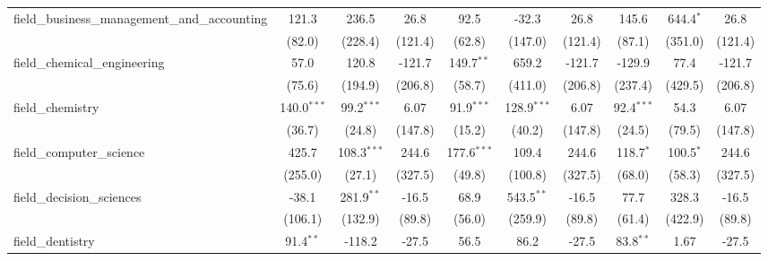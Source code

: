 \begin{tabular}{lccccccccc}
   field\_business\_management\_and\_accounting                & 121.3          & 236.5           & 26.8           & 92.5          & -32.3         & 26.8           & 145.6         & 644.4$^{*}$     & 26.8\\   
                                                               & (82.0)         & (228.4)         & (121.4)        & (62.8)        & (147.0)       & (121.4)        & (87.1)        & (351.0)         & (121.4)\\   
   field\_chemical\_engineering                                & 57.0           & 120.8           & -121.7         & 149.7$^{**}$  & 659.2         & -121.7         & -129.9        & 77.4            & -121.7\\   
                                                               & (75.6)         & (194.9)         & (206.8)        & (58.7)        & (411.0)       & (206.8)        & (237.4)       & (429.5)         & (206.8)\\   
   field\_chemistry                                            & 140.0$^{***}$  & 99.2$^{***}$    & 6.07           & 91.9$^{***}$  & 128.9$^{***}$ & 6.07           & 92.4$^{***}$  & 54.3            & 6.07\\   
                                                               & (36.7)         & (24.8)          & (147.8)        & (15.2)        & (40.2)        & (147.8)        & (24.5)        & (79.5)          & (147.8)\\   
   field\_computer\_science                                    & 425.7          & 108.3$^{***}$   & 244.6          & 177.6$^{***}$ & 109.4         & 244.6          & 118.7$^{*}$   & 100.5$^{*}$     & 244.6\\   
                                                               & (255.0)        & (27.1)          & (327.5)        & (49.8)        & (100.8)       & (327.5)        & (68.0)        & (58.3)          & (327.5)\\   
   field\_decision\_sciences                                   & -38.1          & 281.9$^{**}$    & -16.5          & 68.9          & 543.5$^{**}$  & -16.5          & 77.7          & 328.3           & -16.5\\   
                                                               & (106.1)        & (132.9)         & (89.8)         & (56.0)        & (259.9)       & (89.8)         & (61.4)        & (422.9)         & (89.8)\\   
   field\_dentistry                                            & 91.4$^{**}$    & -118.2          & -27.5          & 56.5          & 86.2          & -27.5          & 83.8$^{**}$   & 1.67            & -27.5\\   

\end{tabular}
